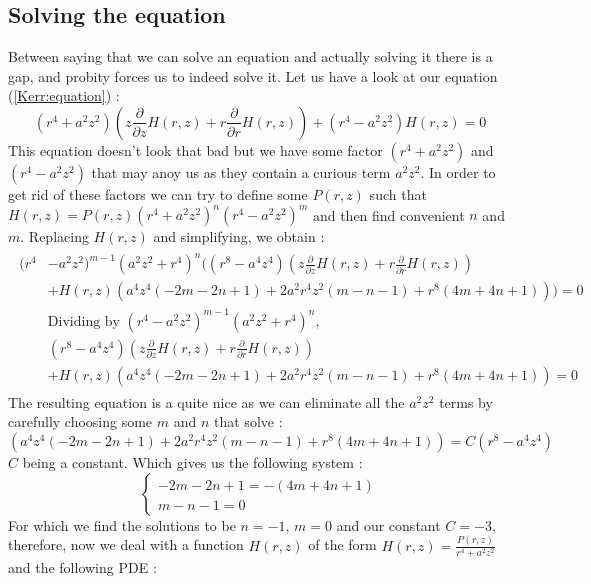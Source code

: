 \documentclass[a4paper,12pt]{article}
\theoremstyle{definition}
\begin{document}
\subsection{Solving the equation}
Between saying that we can solve an equation and actually solving it there is a gap, and probity forces us to indeed solve it.
Let us have a look at our equation (\ref{Kerr:equation}) :
\begin{equation}
	(r^4+a^2z^2)(z \frac{\partial}{\partial z}H(r,z)+r\frac{\partial}{\partial r}H(r,z))+(r^4-a^2 z^2) H(r,z)=0
\end{equation}
This equation doesn't look that bad but we have some factor $(r^4+a^2z^2)$ and $(r^4-a^2 z^2)$ that may anoy us as they contain a curious term $a^2z^2$.
In order to get rid of these factors we can try to define some $P(r,z)$ such that $H(r,z)=P(r,z)(r^4+a^2z^2)^n(r^4-a^2 z^2)^m$ and then find convenient $n$ and $m$.
Replacing $H(r,z)$ and simplifying, we obtain :
\begin{align}
\begin{split}
	(r^4&-a^2 z^2)^{m-1} (a^2z^2+r^4)^n((r^8-a^4 z^4)(z \frac{\partial}{\partial z}H(r,z)+r \frac{\partial}{\partial r}H(r,z))\\
   &+H(r,z)(a^4 z^4 (-2 m-2 n+1)+2 a^2 r^4 z^2 (m-n-1)+r^8(4 m+4 n+1)))=0\\
   &\text{Dividing by }(r^4-a^2 z^2)^{m-1} (a^2z^2+r^4)^n,\\
   &(r^8-a^4 z^4)(z \frac{\partial}{\partial z}H(r,z)+r \frac{\partial}{\partial r}H(r,z))\\
   &+H(r,z)(a^4 z^4 (-2 m-2 n+1)+2 a^2 r^4 z^2 (m-n-1)+r^8(4 m+4 n+1))=0
\end{split}
\end{align}
The resulting equation is a quite nice as we can eliminate all the $a^2z^2$ terms by carefully choosing some $m$ and $n$ that solve :
\begin{equation}
	(a^4 z^4 (-2 m-2 n+1)+2 a^2 r^4 z^2 (m-n-1)+r^8(4 m+4 n+1))=C(r^8-a^4 z^4)
\end{equation}
$C$ being a constant. Which gives us the following system :
\begin{equation}
\begin{cases} -2 m-2 n+1=- (4 m+4 n+1)\\ m-n-1=0 \end{cases}
\end{equation}
For which we find the solutions to be $n=-1$, $m=0$ and our constant $C=-3$, therefore, now we deal with a function $H(r,z)$ of the form $H(r,z)=\frac{P(r,z)}{r^4+a^2z^2}$ and the following PDE :
\end{document}
